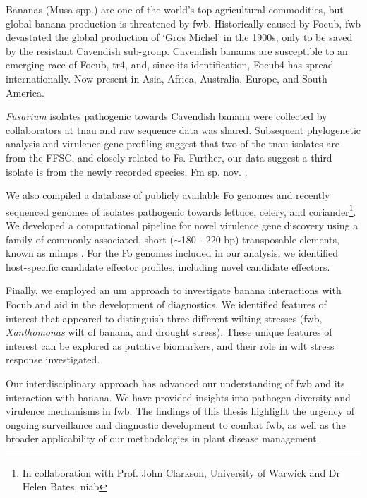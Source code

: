 Bananas (Musa spp.) are one of the world’s top agricultural commodities, but global banana production is threatened by \acf{fwb}. Historically caused by \acf{Focub}, \ac{fwb} devastated the global production of ‘Gros Michel’ in the 1900s, only to be saved by the resistant Cavendish sub-group. Cavendish bananas are susceptible to an emerging race of \ac{Focub}, \ac{tr4}, and, since its identification, \ac{Focub4} has spread internationally. Now present in Asia, Africa, Australia, Europe, and South America. 

\textit{Fusarium} isolates pathogenic towards Cavendish banana were collected by collaborators at \acf{tnau} and raw sequence data was shared. Subsequent phylogenetic analysis and virulence gene profiling suggest that two of the \ac{tnau} isolates are from the \acl{FFSC}, and closely related to \acl{Fs}. Further, our data suggest a third isolate is from the newly recorded species, \acl{Fm} sp. nov. \parencite{Nozawa2023}. 

We also compiled a database of publicly available \acf{Fo} genomes and recently sequenced genomes of isolates pathogenic towards lettuce, celery, and coriander\footnote{In collaboration with Prof. John Clarkson, University of Warwick and Dr Helen Bates, \acl{niab}}. We developed a computational pipeline for novel virulence gene discovery using a family of commonly associated, short ($\sim$180 - 220 bp) transposable elements, known as \aclp{mimp} \parencite{Schmidt2013}. For the \ac{Fo} genomes included in our analysis, we identified host-specific candidate effector profiles, including novel candidate effectors.

Finally, we employed an \acl{um} approach to investigate banana interactions with \ac{Focub} and aid in the development of diagnostics. We identified features of interest that appeared to distinguish three different wilting stresses (\ac{fwb}, \textit{Xanthomonas} wilt of banana, and drought stress). These unique features of interest can be explored as putative biomarkers, and their role in wilt stress response investigated. 

Our interdisciplinary approach has advanced our understanding of \ac{fwb} and its interaction with banana. We have provided insights into pathogen diversity and virulence mechanisms in \ac{fwb}. The findings of this thesis highlight the urgency of ongoing surveillance and diagnostic development to combat \ac{fwb}, as well as the broader applicability of our methodologies in plant disease management. 
